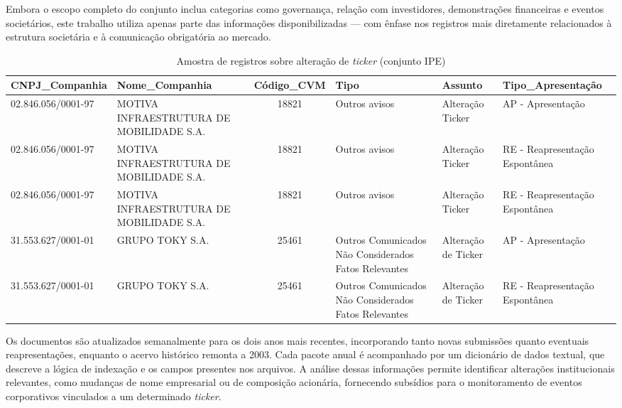 Embora o escopo completo do conjunto inclua categorias como governança, relação com investidores, demonstrações financeiras e eventos societários, este trabalho utiliza apenas parte das informações disponibilizadas — com ênfase nos registros mais diretamente relacionados à estrutura societária e à comunicação obrigatória ao mercado.

\begin{table}[!htb]
	\centering
	\caption{Amostra de registros sobre alteração de \textit{ticker} (conjunto IPE)}
	\label{tab:ipe_amostra_ticker}
	\scriptsize
	\begin{tabularx}{\textwidth}{|l|X|c|X|X|X|}
		\hline
		\textbf{CNPJ\_Companhia} & \textbf{Nome\_Companhia} & \textbf{Código\_CVM} & \textbf{Tipo} & \textbf{Assunto} & \textbf{Tipo\_Apresentação} \\
		\hline
		02.846.056/0001-97 & MOTIVA INFRAESTRUTURA DE MOBILIDADE S.A. & 18821 & Outros avisos & Alteração Ticker & AP - Apresentação \\
		\hline
		02.846.056/0001-97 & MOTIVA INFRAESTRUTURA DE MOBILIDADE S.A. & 18821 & Outros avisos & Alteração Ticker & RE - Reapresentação Espontânea \\
		\hline
		02.846.056/0001-97 & MOTIVA INFRAESTRUTURA DE MOBILIDADE S.A. & 18821 & Outros avisos & Alteração Ticker & RE - Reapresentação Espontânea \\
		\hline
		31.553.627/0001-01 & GRUPO TOKY S.A. & 25461 & Outros Comunicados Não Considerados Fatos Relevantes & Alteração de Ticker & AP - Apresentação \\
		\hline
		31.553.627/0001-01 & GRUPO TOKY S.A. & 25461 & Outros Comunicados Não Considerados Fatos Relevantes & Alteração de Ticker & RE - Reapresentação Espontânea \\
		\hline
	\end{tabularx}
\end{table}




Os documentos são atualizados semanalmente para os dois anos mais recentes, incorporando tanto novas submissões quanto eventuais reapresentações, enquanto o acervo histórico remonta a 2003. Cada pacote anual é acompanhado por um dicionário de dados textual, que descreve a lógica de indexação e os campos presentes nos arquivos. A análise dessas informações permite identificar alterações institucionais relevantes, como mudanças de nome empresarial ou de composição acionária, fornecendo subsídios para o monitoramento de eventos corporativos vinculados a um determinado \textit{ticker}.

